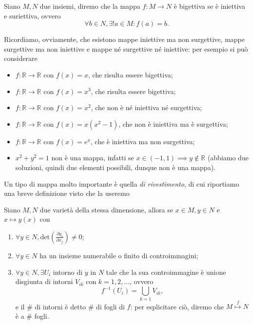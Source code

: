 \begin{definition}
	Siano $M, N$ due insiemi, diremo che la mappa $f: M \to N$ è bigettiva se è iniettiva e suriettiva, ovvero
	\begin{equation}
		\forall b \in N, \exists! a \in M : f(a) = b.
	\end{equation}
\end{definition}
Ricordiamo, ovviamente, che esistono mappe iniettive ma non surgettive, mappe surgettive ma non iniettive e mappe né surgettive né iniettive: per esempio si può considerare 
\begin{itemize}
	\item $f: \mathbb{R} \to \mathbb{R}$ con $f(x) = x$, che risulta essere bigettiva;
	\item $f: \mathbb{R} \to \mathbb{R}$ con $f(x) = x^3$, che risulta essere bigettiva;
	\item $f: \mathbb{R} \to \mathbb{R}$ con $f(x) = x^2$, che non è né iniettiva né surgettiva;
	\item $f: \mathbb{R} \to \mathbb{R}$ con $f(x) = x(x^2 - 1)$, che non è iniettiva ma è surgettiva;
	\item $f: \mathbb{R} \to \mathbb{R}$ con $f(x) = e^x$, che è iniettiva ma non surgettiva;
	\item $x^2 + y^2 = 1$ non è una mappa, infatti se $x \in (-1, 1) \implies y \not\in \mathbb{R}$ (abbiamo due soluzioni, quindi due elementi possibili, dunque non è una mappa).
\end{itemize}

Un tipo di mappa molto importante è quella \emph{di rivestimento}, di cui riportiamo una breve definizione visto che la useremo
\begin{definition}
	Siano $M, N$ due varietà della stessa dimensione, allora se $x \in M, y \in N$ e $x \mapsto y(x)$ con
	\begin{enumerate}[label=\protect\circled{\arabic*}]
		\item $\forall y \in N, \text{det}\left( \frac{\partial y_i}{\partial x_j} \right) \neq 0$;
		\item $\forall y \in N$ ha un insieme numerabile o finito di controimmagini;
		\item $\forall y \in N, \exists U_i$ intorno di $y$ in $N$ tale che la sua controimmagine è unione disgiunta di intorni $V_{ik}$ con $k = 1, 2, \ldots$, ovvero
		\begin{equation}
			f^{-1}(U_i) = \bigcup_{k=1} V_{ik},
		\end{equation}
		e il \# di intorni è detto \# di fogli di $f$: per esplicitare ciò, diremo che $M \stackrel{f}{\mapsto} N$ è a \# fogli.
	\end{enumerate}
\end{definition}

